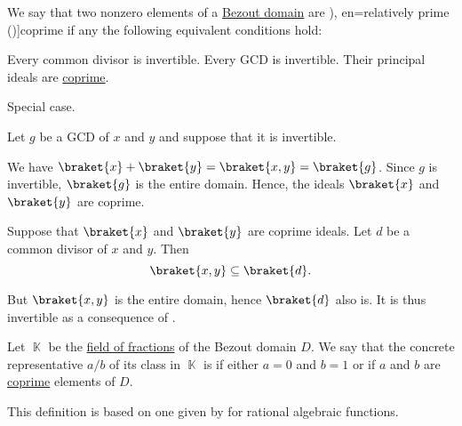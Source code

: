 \begin{definition}\label{def:coprime_elements}\mimprovised
  We say that two nonzero elements of a \hyperref[def:bezout_domain]{Bezout domain} are \term[ru=взаимно простые (идеалы) (\cite[120]{Винберг2014КурсАлгебры}), en=relatively prime (\cite[113]{Lang2002Algebra})]{coprime} if any the following equivalent conditions hold:
  \begin{thmenum}
     Every common divisor is invertible.
     Every GCD is invertible.
     Their principal ideals are \hyperref[def:semiring_ideal/coprime]{coprime}.
  \end{thmenum}
\end{definition}
\begin{defproof}
   Special case.

   Let \( g \) be a GCD of \( x \) and \( y \) and suppose that it is invertible.

  We have \( \braket{ x } + \braket{ y } = \braket{ x, y } = \braket{ g } \). Since \( g \) is invertible, \( \braket{ g } \) is the entire domain. Hence, the ideals \( \braket{ x } \) and \( \braket{ y } \) are coprime.

   Suppose that \( \braket{ x } \) and \( \braket{ y } \) are coprime ideals. Let \( d \) be a common divisor of \( x \) and \( y \). Then
  \begin{equation*}
    \braket{ x, y } \subseteq \braket{ d }.
  \end{equation*}

  But \( \braket{ x, y } \) is the entire domain, hence \( \braket{ d } \) also is. It is thus invertible as a consequence of .
\end{defproof}

\begin{definition}\label{def:lowest_terms}\mimprovised
  Let \( \BbbK \) be the \hyperref[def:field_of_fractions]{field of fractions} of the Bezout domain \( D \). We say that the concrete representative \( a / b \) of its class in \( \BbbK \) is  if either \( a = 0 \) and \( b = 1 \) or if \( a \) and \( b \) are \hyperref[def:coprime_elements]{coprime} elements of \( D \).
\end{definition}
\begin{comments}
  \item This definition is based on one given by  for rational algebraic functions.
\end{comments}

